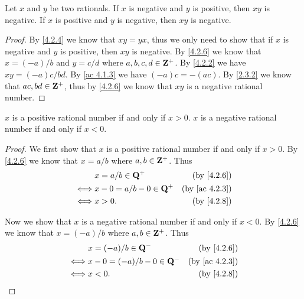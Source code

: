 \begin{additional corollary}\label{ac 4.2.6}
Let \(x\) and \(y\) be two rationals.
If \(x\) is negative and \(y\) is positive, then \(xy\) is negative.
If \(x\) is positive and \(y\) is negative, then \(xy\) is negative.
\end{additional corollary}

\begin{proof}
  By \cref{4.2.4} we know that \(xy = yx\), thus we only need to show that if \(x\) is negative and \(y\) is positive, then \(xy\) is negative.
  By \cref{4.2.6} we know that \(x = (-a) / b\) and \(y = c / d\) where \(a, b, c, d \in \mathbf{Z}^+\).
  By \cref{4.2.2} we have \(xy = (-a)c / bd\).
  By \cref{ac 4.1.3} we have \((-a)c = -(ac)\).
  By \cref{2.3.2} we know that \(ac, bd \in \mathbf{Z}^+\), thus by \cref{4.2.6} we know that \(xy\) is a negative rational number.
\end{proof}

\begin{additional corollary}\label{ac 4.2.7}
\(x\) is a positive rational number if and only if \(x > 0\).
\(x\) is a negative rational number if and only if \(x < 0\).
\end{additional corollary}

\begin{proof}
  We first show that \(x\) is a positive rational number if and only if \(x > 0\).
  By \cref{4.2.6} we know that \(x = a / b\) where \(a, b \in \mathbf{Z}^+\).
  Thus
  \begin{align*}
         & x = a / b \in \Q^+         & \text{(by \cref{4.2.6})}    \\
    \iff & x - 0 = a / b - 0 \in \Q^+ & \text{(by \cref{ac 4.2.3})} \\
    \iff & x > 0.                     & \text{(by \cref{4.2.8})}
  \end{align*}

  Now we show that \(x\) is a negative rational number if and only if \(x < 0\).
  By \cref{4.2.6} we know that \(x = (-a) / b\) where \(a, b \in \mathbf{Z}^+\).
  Thus
  \begin{align*}
         & x = (-a) / b \in \Q^-         & \text{(by \cref{4.2.6})}    \\
    \iff & x - 0 = (-a) / b - 0 \in \Q^- & \text{(by \cref{ac 4.2.3})} \\
    \iff & x < 0.                        & \text{(by \cref{4.2.8})}
  \end{align*}
\end{proof}

